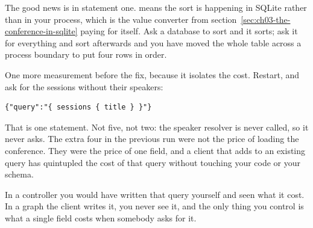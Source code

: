 %
The good news is in statement one.  means the
sort is happening in SQLite rather than in your process, which is the value
converter from section~\ref{sec:ch03-the-conference-in-sqlite} paying for
itself. Ask a database to sort and it sorts; ask it for everything and sort
afterwards and you have moved the whole table across a process boundary to
put four rows in order.

%
One more measurement before the fix, because it isolates the cost. Restart, and
ask for the sessions without their speakers:

\begin{verbatim}
{"query":"{ sessions { title } }"}
\end{verbatim}

That is one statement. Not five, not two: the speaker resolver is never called,
so it never asks. The extra four in the previous run were not the price of
loading the conference. They were the price of one field, and a client that
adds  to an existing query has quintupled the cost of
that query without touching your code or your schema.

In a controller you would have written that query yourself and seen what it
cost. In a graph the client writes it, you never see it, and the only thing you
control is what a single field costs when somebody asks for it.

